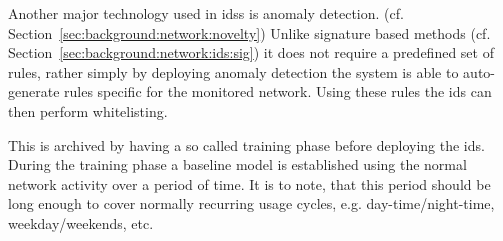 Another major technology used in \glspl{ids} is anomaly detection. (cf. Section~\ref{sec:background:network:novelty})
Unlike signature based methods (cf. Section~\ref{sec:background:network:ids:sig}) it does not require a predefined set of rules, rather simply by deploying anomaly detection the system is able to auto-generate rules specific for the monitored network. Using these rules the \gls{ids} can then perform whitelisting.

This is archived by having a so called training phase before deploying the \gls{ids}. During the training phase a baseline model is established using the normal network activity over a period of time. It is to note, that this period should be long enough to cover normally recurring usage cycles, e.g. day-time/night-time, weekday/weekends, etc.

